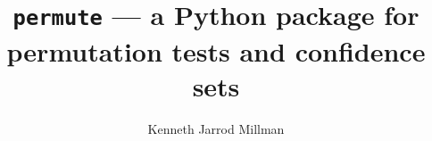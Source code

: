 \documentclass[masters]{ucbthesis}
\begin{document}

\title{\texttt{permute} --- a Python package for permutation tests and confidence sets}
\author{Kenneth Jarrod Millman}


\maketitle
\approvalpage
\copyrightpage

%

\begin{frontmatter}



\tableofcontents
\clearpage



\end{frontmatter}

\pagestyle{headings}

\renewcommand\thmcontinues[1]{Continued}






%

\printbibliography
\end{document}
